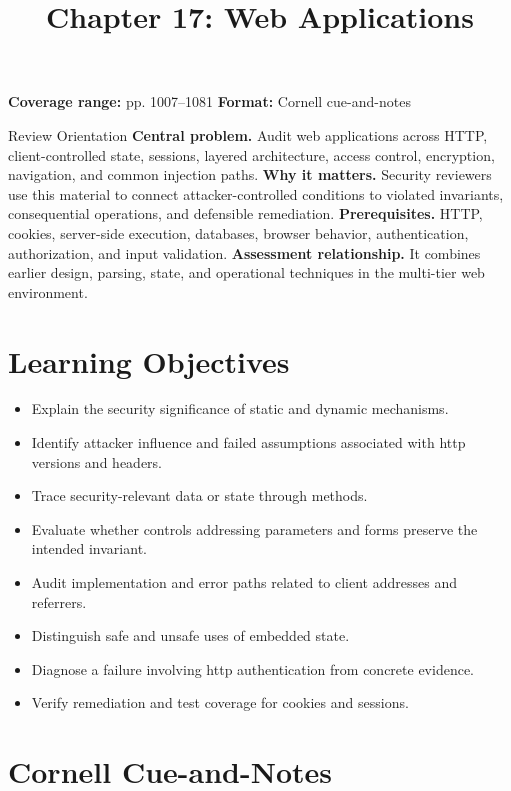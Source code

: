 \documentclass[11pt,letterpaper]{article}
\title{Chapter 17: Web Applications}
\author{}
\date{}
\begin{document}
\maketitle

\begin{center}
\small\color{Meta}\textbf{Coverage range:} pp. 1007--1081 \quad\textbullet\quad \textbf{Format:} Cornell cue-and-notes
\end{center}
\vspace{0.25em}
\begin{CornellOverviewBox}{Review Orientation}
\textbf{Central problem.} Audit web applications across HTTP, client-controlled state, sessions, layered architecture, access control, encryption, navigation, and common injection paths.
\textbf{Why it matters.} Security reviewers use this material to connect attacker-controlled conditions to violated invariants, consequential operations, and defensible remediation.
\textbf{Prerequisites.} HTTP, cookies, server-side execution, databases, browser behavior, authentication, authorization, and input validation.
\textbf{Assessment relationship.} It combines earlier design, parsing, state, and operational techniques in the multi-tier web environment.
\end{CornellOverviewBox}
\section{Learning Objectives}
\begin{itemize}
\item Explain the security significance of static and dynamic mechanisms.
\item Identify attacker influence and failed assumptions associated with http versions and headers.
\item Trace security-relevant data or state through methods.
\item Evaluate whether controls addressing parameters and forms preserve the intended invariant.
\item Audit implementation and error paths related to client addresses and referrers.
\item Distinguish safe and unsafe uses of embedded state.
\item Diagnose a failure involving http authentication from concrete evidence.
\item Verify remediation and test coverage for cookies and sessions.
\end{itemize}
\section{Cornell Cue-and-Notes}
\end{document}
